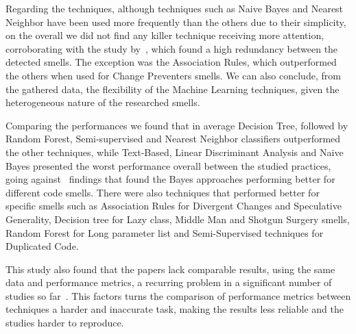 Regarding the techniques, although techniques such as Naive Bayes and Nearest Neighbor have been used more frequently than the others due to their simplicity, on the overall we did not find any killer technique receiving more attention, corroborating with the study by~\cite{fernandes2016review}, which found a high redundancy between the detected smells. The exception was the Association Rules, which outperformed the others when used for Change Preventers smells. We can also conclude, from the gathered data, the flexibility of the Machine Learning techniques, given the heterogeneous nature of the researched smells.

Comparing the performances we found that in average Decision Tree, followed by Random Forest, Semi-supervised and Nearest Neighbor classifiers outperformed the other techniques, while Text-Based, Linear Discriminant Analysis and Naive Bayes presented the worst performance overall between the studied practices, going against~\cite{fontana2016comparing} findings that found the Bayes approaches performing better for different code smells. There were also techniques that performed better for specific smells such as Association Rules for Divergent Changes and Speculative Generality, Decision tree for Lazy class, Middle Man and Shotgun Surgery smells, Random Forest for Long parameter list and Semi-Supervised techniques for Duplicated Code. 

This study also found that the papers lack comparable results, using the same data and performance metrics, a recurring problem in a significant number of studies so far~\citep{rattan2013software, al2015identifying, rasool2015review, fernandes2016review}. This factors turns the comparison of performance metrics between techniques a harder and inaccurate task, making the results less reliable and the studies harder to reproduce.
